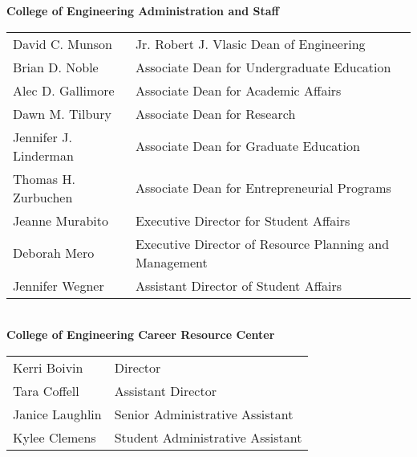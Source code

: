 \documentclass[twoside]{article}
\begin{document}
    { \fontsize{14}{17}\selectfont \bf College of Engineering Administration and Staff}\\\begin{tabular}{p{2in}l}
    David C. Munson	&	 Jr. Robert J. Vlasic Dean of Engineering\\
        Brian D. Noble	&	 Associate Dean for Undergraduate Education\\
        Alec D. Gallimore	&	 Associate Dean for Academic Affairs\\
        Dawn M. Tilbury	&	 Associate Dean for Research\\
        Jennifer J. Linderman	&	 Associate Dean for Graduate Education \\
        Thomas H. Zurbuchen	&	 Associate Dean for Entrepreneurial Programs\\
        Jeanne Murabito	&	 Executive Director for Student Affairs\\
        Deborah Mero	&	 Executive Director of Resource Planning and Management\\
        Jennifer Wegner	&	 Assistant Director of Student Affairs\\
        \end{tabular}\\[1em]
    
    { \fontsize{14}{17}\selectfont \bf College of Engineering Career Resource Center}\\\begin{tabular}{p{2in}l}
    Kerri Boivin	&	 Director\\
        Tara Coffell	&	 Assistant Director\\
        Janice Laughlin	&	 Senior Administrative Assistant\\
        Kylee Clemens	&	 Student Administrative Assistant\\
        \end{tabular}\\[1em]
    
\end{document}
